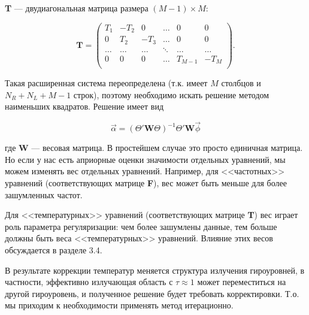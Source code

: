 \documentclass[
 aps, pra,
 amsmath,amssymb,
 11pt,
 final,
tightenlines,
 twoside,
 twocolumn,
 nofloats,
nofootinbib,
 superscriptaddress,
showkeys,
showkeywords,
 ]
{revtex4-2}
\newcommand{\as}[1]{{\color{blue} #1}}
\begin{document}
\textbf{T} --- двудиагональная матрица размера $(M-1) \times M$:

\begin{equation} \label{SLE_2diagT}
\textbf{T} =
\left( 
\begin{matrix}
T_1    & -T_2   &  0     & \hdots & 0         & 0      \\
0      &  T_2   & -T_3   & \hdots & 0         & 0      \\
\hdots & \hdots & \hdots & \ddots & \hdots    & \hdots \\
0      &  0     &  0     & \hdots & T_{M-1}   & -T_M   \\
\end{matrix}
\right).
\end{equation}

Такая расширенная система переопределена (т.к. имеет $M$ столбцов и $N_R+N_L+M-1$ строк), поэтому необходимо искать решение методом наименьших квадратов. Решение имеет вид

\begin{equation}
\vec \alpha = (\Theta' \textbf{W} \Theta)^{-1} \Theta' \textbf{W} \vec \phi
\label{eq:LMS}
\end{equation}

где $\mathbf{W}$ --- весовая матрица. В простейшем случае это просто единичная матрица. Но если у нас есть априорные оценки значимости отдельных уравнений, \as{мы можем изменять вес отдельных уравнений. Например, для <<частотных>> уравнений (соответствующих матрице {\bf F}), вес может быть меньше для более зашумленных частот.}

\as{Для <<температурных>> уравнений (соответствующих матрице {\bf T}) вес играет роль параметра регуляризации: чем более зашумлены данные, тем больше должны быть веса <<температурных>> уравнений. Влияние этих весов обсуждается в разделе 3.4.}

\as{В результате коррекции температур меняется структура излучения гироуровней, в частности, эффективно излучающая область с $\tau \approx 1$ может переместиться на другой гироуровень, и полученное решение будет требовать корректировки. Т.о. мы приходим к необходимости применять метод итерационно.}
\end{document}

